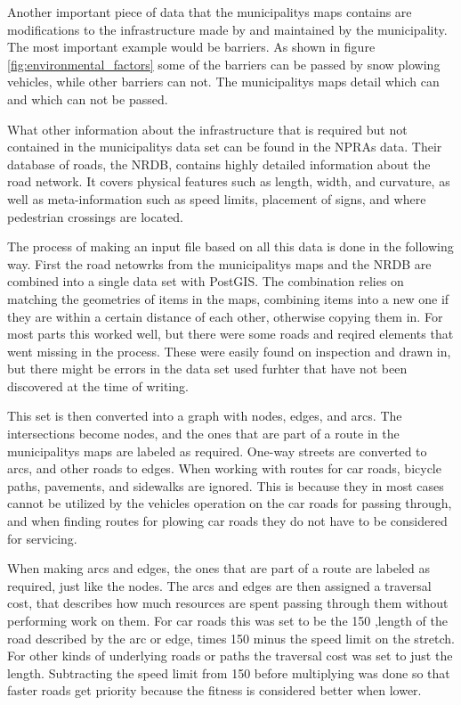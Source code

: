 Another important piece of data that the municipalitys maps contains are modifications to the infrastructure made by and maintained by the municipality. The most important example would be barriers. As shown in figure \ref{fig:environmental_factors} some of the barriers can be passed by snow plowing vehicles, while other barriers can not. The municipalitys maps detail which can and which can not be passed.

What other information about the infrastructure that is required but not contained in the municipalitys data set can be found in the NPRAs data. Their database of roads, the NRDB, contains highly detailed information about the road network. It covers physical features such as length, width, and curvature, as well as meta-information such as speed limits, placement of signs, and where pedestrian crossings are located.

The process of making an input file based on all this data is done in the following way. First the road netowrks from the municipalitys maps and the NRDB are combined into a single data set with PostGIS. The combination relies on matching the geometries of items in the maps, combining items into a new one if they are within a certain distance of each other, otherwise copying them in. For most parts this worked well, but there were some roads and reqired elements that went missing in the process. These were easily found on inspection and drawn in, but there might be errors in the data set used furhter that have not been discovered at the time of writing.

This set is then converted into a graph with nodes, edges, and arcs. The intersections become nodes, and the ones that are part of a route in the municipalitys maps are labeled as required. One-way streets are converted to arcs, and other roads to edges. When working with routes for car roads, bicycle paths, pavements, and sidewalks are ignored. This is because they in most cases cannot be utilized by the vehicles operation on the car roads for passing through, and when finding routes for plowing car roads they do not have to be considered for servicing.

When making arcs and edges, the ones that are part of a route are labeled as required, just like the nodes. The arcs and edges are then assigned a traversal cost, that describes how much resources are spent passing through them without performing work on them. For car roads this was set to be the 150 ,length of the road described by the arc or edge, times 150 minus the speed limit on the stretch. For other kinds of underlying roads or paths the traversal cost was set to just the length. Subtracting the speed limit from 150 before multiplying was done so that faster roads get priority because the fitness is considered better when lower.

